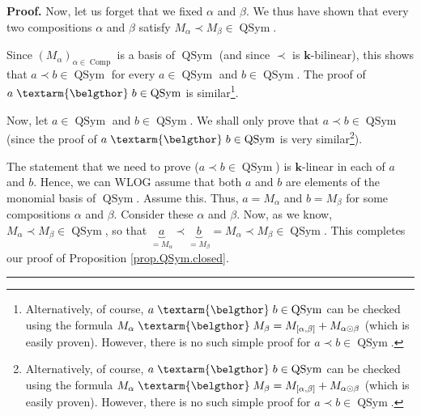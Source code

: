 \documentclass
[numbers=enddot,12pt,final,onecolumn,notitlepage,abstracton]{scrartcl}%
\theoremstyle{definition}
\newenvironment{proof}[1][Proof]{\noindent\textbf{#1.} }{\ \rule{0.5em}{0.5em}}
\newenvironment{verlong}{}{}
\newenvironment{vershort}{}{}
\newcommand{\bel}{\left. \textarm{\belgthor} \right.}
\begin{document}
\begin{proof}
Now, let us forget that we fixed $\alpha$ and $\beta$. We thus have shown that
every two compositions $\alpha$ and $\beta$ satisfy $M_{\alpha}\left.
\prec\right.  M_{\beta}\in\operatorname*{QSym}$.

\begin{vershort}
Since $\left(  M_{\alpha}\right)  _{\alpha\in\operatorname*{Comp}}$ is a basis
of $\operatorname*{QSym}$ (and since $\left.  \prec\right.  $ is $\mathbf{k}%
$-bilinear), this shows that $a\left.  \prec\right.  b\in\operatorname*{QSym}$
for every $a\in\operatorname*{QSym}$ and $b\in\operatorname*{QSym}$. The proof
of $a \bel b\in\operatorname*{QSym}$ is similar\footnote{Alternatively, of
course, $a \bel b\in\operatorname*{QSym}$ can be checked using the formula
$M_{\alpha} \bel M_{\beta}=M_{\left[  \alpha,\beta\right]  }+M_{\alpha
\odot\beta}$ (which is easily proven). However, there is no such simple proof
for $a\left.  \prec\right.  b\in\operatorname*{QSym}$.}.
\end{vershort}

\begin{verlong}
Now, let $a\in\operatorname*{QSym}$ and $b\in\operatorname*{QSym}$. We shall
only prove that $a\left.  \prec\right.  b\in\operatorname*{QSym}$ (since the
proof of $a \bel b\in\operatorname*{QSym}$ is very
similar\footnote{Alternatively, of course, $a \bel b\in\operatorname*{QSym}$
can be checked using the formula $M_{\alpha} \bel M_{\beta}=M_{\left[
\alpha,\beta\right]  }+M_{\alpha\odot\beta}$ (which is easily proven).
However, there is no such simple proof for $a\left.  \prec\right.
b\in\operatorname*{QSym}$.}).

The statement that we need to prove ($a\left.  \prec\right.  b\in
\operatorname*{QSym}$) is $\mathbf{k}$-linear in each of $a$ and $b$. Hence,
we can WLOG assume that both $a$ and $b$ are elements of the monomial basis of
$\operatorname*{QSym}$. Assume this. Thus, $a=M_{\alpha}$ and $b=M_{\beta}$
for some compositions $\alpha$ and $\beta$. Consider these $\alpha$ and
$\beta$. Now, as we know, $M_{\alpha}\left.  \prec\right.  M_{\beta}%
\in\operatorname*{QSym}$, so that $\underbrace{a}_{=M_{\alpha}}\left.
\prec\right.  \underbrace{b}_{=M_{\beta}}=M_{\alpha}\left.  \prec\right.
M_{\beta}\in\operatorname*{QSym}$. This completes our proof of Proposition
\ref{prop.QSym.closed}.
\end{verlong}
\end{proof}

\Needspace{6pc}
\end{document}

